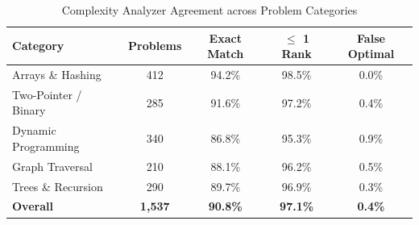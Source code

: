 \begin{table}[!t]
\centering
\caption{Complexity Analyzer Agreement across Problem Categories}
\label{tab:complexity_perf_breakdown}
\begin{tabular}{lcccc}
\toprule
\textbf{Category} & \textbf{Problems} & \textbf{Exact Match} & \textbf{$\le$ 1 Rank} & \textbf{False Optimal} \\
\midrule
Arrays \& Hashing    & 412 & 94.2\% & 98.5\% & 0.0\% \\
Two-Pointer / Binary & 285 & 91.6\% & 97.2\% & 0.4\% \\
Dynamic Programming  & 340 & 86.8\% & 95.3\% & 0.9\% \\
Graph Traversal      & 210 & 88.1\% & 96.2\% & 0.5\% \\
Trees \& Recursion   & 290 & 89.7\% & 96.9\% & 0.3\% \\
\midrule
\textbf{Overall}     & \textbf{1,537} & \textbf{90.8\%} & \textbf{97.1\%} & \textbf{0.4\%} \\
\bottomrule
\end{tabular}
\end{table}
